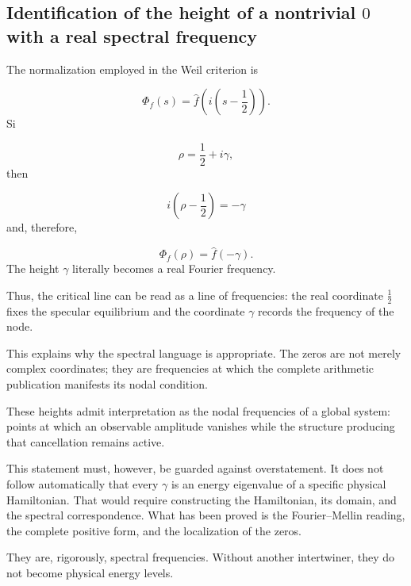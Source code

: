 \subsection{Identification of the height of a nontrivial \(0\) with a real spectral frequency}
The normalization employed in the Weil criterion is\par
\[
\Phi_f(s)
=
\widehat f\!\left(
i\left(s-\frac12\right)
\right).
\]
Si\par
\[
\rho=\frac12+i\gamma,
\]
then\par
\[
i\left(\rho-\frac12\right)
=
-\gamma
\]
and, therefore,\par
\[
\Phi_f(\rho)
=
\widehat f(-\gamma).
\]
The height \(\gamma\) literally becomes a real Fourier frequency.\par
Thus, the critical line can be read as a line of frequencies: the real coordinate \(\tfrac12\) fixes the specular equilibrium and the coordinate \(\gamma\) records the frequency of the node.\par
This explains why the spectral language is appropriate. The zeros are not merely complex coordinates; they are frequencies at which the complete arithmetic publication manifests its nodal condition.\par
These heights admit interpretation as the nodal frequencies of a global
system: points at which an observable amplitude vanishes while the
structure producing that cancellation remains active.\par
This statement must, however, be guarded against overstatement. It does not follow automatically that every \(\gamma\) is an energy eigenvalue of a specific physical Hamiltonian. That would require constructing the Hamiltonian, its domain, and the spectral correspondence. What has been proved is the Fourier–Mellin reading, the complete positive form, and the localization of the zeros.\par
They are, rigorously, spectral frequencies. Without another intertwiner, they do not become physical energy levels.\par
{}
